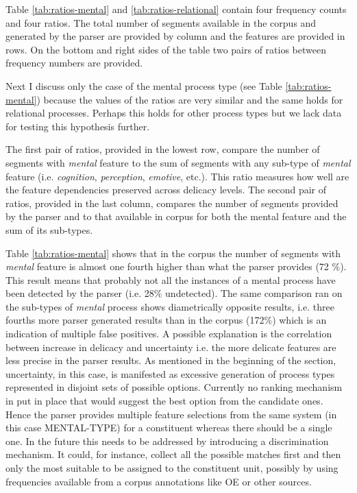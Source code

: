     Table \ref{tab:ratios-mental} and \ref{tab:ratios-relational} contain four frequency counts and four ratios. The total number of segments available in the corpus and generated by the parser are provided by column and the features are provided in rows. On the bottom and right sides of the table two pairs of ratios between frequency numbers are provided. 
    
    Next I discuss only the case of the mental process type (see Table \ref{tab:ratios-mental}) because the values of the ratios are very similar and the same holds for relational processes. Perhaps this holds for other process types but we lack data for testing this hypothesis further. 
    
    The first pair of ratios, provided in the lowest row, compare the number of segments with \textit{mental} feature to the sum of segments with any sub-type of \textit{mental} feature (i.e.  \textit{cognition}, \textit{perception}, \textit{emotive}, etc.). This ratio measures how well are the feature dependencies preserved across delicacy levels. The second pair of ratios, provided in the last column, compares the number of segments provided by the parser and to that available in corpus for both the mental feature and the sum of its sub-types.
    
    Table \ref{tab:ratios-mental} shows that in the corpus the number of segments with \textit{mental} feature is almost one fourth higher than what the parser provides (72 \%). This result means that probably not all the instances of a mental process have been detected by the parser (i.e. 28\% undetected). The same comparison ran on the sub-types of \textit{mental} process shows diametrically opposite results, i.e. three fourths more parser generated results than in the corpus (172\%) which is an indication of multiple false positives. A possible explanation is the correlation between increase in delicacy and uncertainty i.e. the more delicate features are less precise in the parser results. As mentioned in the beginning of the section, uncertainty, in this case, is manifested as excessive generation of process types represented in disjoint sets of possible options. Currently no ranking mechanism in put in place that would suggest the best option from the candidate ones. Hence the parser provides multiple feature selections from the same system (in this case MENTAL-TYPE) for a constituent whereas there should be a single one. In the future this needs to be addressed by introducing a discrimination mechanism. It could, for instance, collect all the possible matches first and then only the most suitable to be assigned to the constituent unit, possibly by using frequencies available from a corpus annotations like OE or other sources.
    
